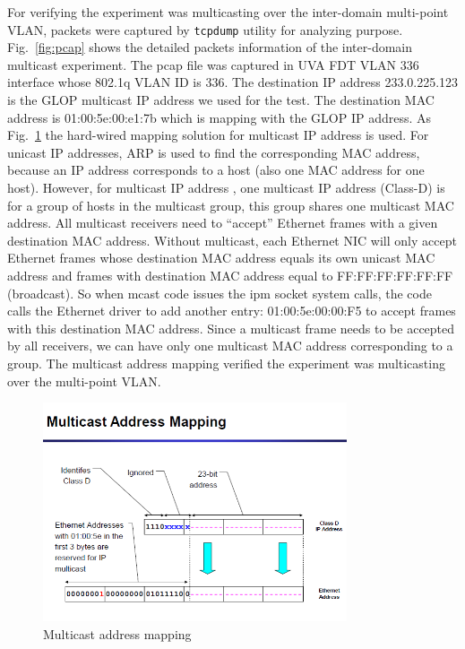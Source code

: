 For verifying the experiment was multicasting over the inter-domain multi-point VLAN, packets were captured by \texttt{tcpdump} utility for analyzing purpose. Fig.~\ref{fig:pcap} shows the detailed packets information of the inter-domain multicast experiment. The pcap file was captured in UVA FDT VLAN 336 interface whose 802.1q VLAN ID is 336. The destination IP address 233.0.225.123 is the GLOP multicast IP address we used for the test. The destination MAC address is 01:00:5e:00:e1:7b which is mapping with the GLOP IP address. As Fig.~\ref{fig:mapping} the hard-wired mapping solution for multicast IP address is used. For unicast IP addresses, ARP is used to find the corresponding MAC address, because an IP address corresponds to a host (also one MAC address for one host). However, for multicast IP address , one multicast IP address (Class-D) is for a group of hosts in the multicast group, this group shares one multicast MAC address. All multicast receivers need to “accept” Ethernet frames with a given destination MAC address. Without multicast, each Ethernet NIC will only accept Ethernet frames whose destination MAC address equals its own unicast MAC address and frames with destination MAC address equal to FF:FF:FF:FF:FF:FF (broadcast). So when mcast code issues the ipm socket system calls, the code calls the Ethernet driver to add another entry: 01:00:5e:00:00:F5 to accept frames with this destination MAC address. Since a multicast frame needs to be accepted by all receivers, we can have only one multicast MAC address corresponding to a group. The multicast address mapping verified the experiment was multicasting over the multi-point VLAN.


\begin{figure}[htb!]
\centering
\includegraphics[width=0.8\textwidth]{figures/mapping.png}
\caption{Multicast address mapping}
\label{fig:mapping}
\end{figure}


